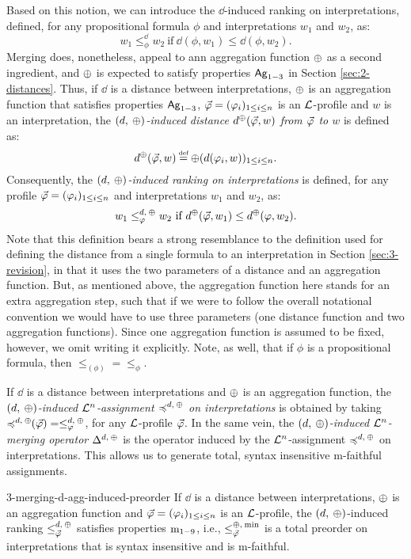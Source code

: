 Based on this notion, we can introduce the 
$\dd$-induced ranking on interpretations, defined,
for any propositional formula $\phi$ and 
interpretations $w_1$ and $w_2$, as:
$$
	w_1 \le^{\dd}_{\phi} w_2~\text{if}~\dd(\phi,w_1)\le \dd(\phi,w_2).
$$
Merging does, nonetheless, appeal to ann aggregation function $\agg$
as a second ingredient, and $\agg$ is expected to 
satisfy properties $\ooa{1-3}$ in Section \ref{sec:2-distances}.
Thus, if 
$\dd$ is a distance between interpretations,
$\agg$ is an aggregation function that satisfies properties $\ooa{1-3}$,
$\P=(\phi_i)_{1\le i \le n}$ is an $\L$-profile 
and $w$ is an interpretation,
the \emph{$(\dd,\:\agg)$-induced distance $\dd^\agg(\P,w)$ from $\P$ to $w$}
is defined as:
$$
	\dd^\agg(\P,w)\defeq\agg(\dd(\phi_{i},w))_{1\le i\le n}.
$$
Consequently, the \emph{$(\dd,\:\agg)$-induced ranking on interpretations} 
is defined, for any profile $\P=(\phi_i)_{1\le i \le n}$
and interpretations $w_1$ and $w_2$, as:
$$
	w_1 \le^{\dd,\:\agg}_{\phi} w_2~\text{if}~\dd^{\agg}(\P,w_1)\le \dd^{\agg}(\phi,w_2).
$$
Note that this definition bears a strong resemblance to the 
definition used for defining the distance from a single formula to 
an interpretation in Section \ref{sec:3-revision},
in that it uses the two parameters of a distance and an aggregation function.
But, as mentioned above, the aggregation function here stands for an extra aggregation
step, such that if we were to follow the overall notational convention 
we would have to use three parameters (one distance function and two aggregation functions).
Since one aggregation function is assumed to be fixed, however,
we omit writing it explicitly.
Note, as well, that if $\phi$ is a propositional formula, then 
$\le_{(\phi)} = \le_{\phi}$.

If $\dd$ is a distance between interpretations
and $\agg$ is an aggregation function,
the \emph{${(\dd,\:\agg)}$-induced $\L^n$-assignment $\as^{\dd,\:\agg}$ on interpretations} 
is obtained by taking 
$\as^{\dd,\:\agg}\!\!(\P)=\le_\phi^{\dd,\:\agg}$,
for any $\L$-profile $\P$.
In the same vein, 
the \emph{${(\dd,\:\agg)}$-induced $\L^n$-merging operator $\me^{\dd,\:\agg}$} 
is the operator induced by the $\L^n$-assignment 
$\as^{\dd,\:\agg}$ on interpretations.
This allows us to generate total, syntax insensitive m-faithful assignments.

\begin{prp}{\cite{KoniecznyP11}}{3-merging-d-agg-induced-preorder}
	If $\dd$ is a distance between interpretations,
	$\agg$ is an aggregation function	
	and $\P=(\phi_i)_{1\le i \le n}$ is an $\L$-profile, 
	the ${(\dd,\:\agg)}$-induced ranking $\le^{\dd,\:\agg}_\P$ 
	satisfies properties $\oom{1-9}$, 
	i.e., $\le^{\agg,\:\min}_\P$ is a total preorder on interpretations that
	is syntax insensitive and is m-faithful.
\end{prp}

